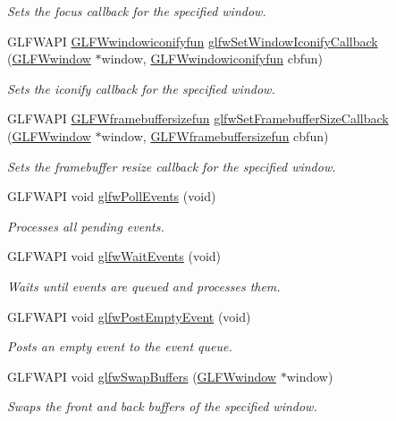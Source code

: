 \begin{DoxyCompactItemize}
\begin{DoxyCompactList}\small\item\em Sets the focus callback for the specified window. \end{DoxyCompactList}\item 
G\+L\+F\+W\+A\+P\+I \hyperlink{group__window_gad2d4e4c3d28b1242e742e8268b9528af}{G\+L\+F\+Wwindowiconifyfun} \hyperlink{group__window_ga17cd86946117b56c76397530900519db}{glfw\+Set\+Window\+Iconify\+Callback} (\hyperlink{group__window_ga3c96d80d363e67d13a41b5d1821f3242}{G\+L\+F\+Wwindow} $\ast$window, \hyperlink{group__window_gad2d4e4c3d28b1242e742e8268b9528af}{G\+L\+F\+Wwindowiconifyfun} cbfun)
\begin{DoxyCompactList}\small\item\em Sets the iconify callback for the specified window. \end{DoxyCompactList}\item 
G\+L\+F\+W\+A\+P\+I \hyperlink{group__window_ga3e218ef9ff826129c55a7d5f6971a285}{G\+L\+F\+Wframebuffersizefun} \hyperlink{group__window_gad766bcdb4465f9c6c62e5d8ca7cfba56}{glfw\+Set\+Framebuffer\+Size\+Callback} (\hyperlink{group__window_ga3c96d80d363e67d13a41b5d1821f3242}{G\+L\+F\+Wwindow} $\ast$window, \hyperlink{group__window_ga3e218ef9ff826129c55a7d5f6971a285}{G\+L\+F\+Wframebuffersizefun} cbfun)
\begin{DoxyCompactList}\small\item\em Sets the framebuffer resize callback for the specified window. \end{DoxyCompactList}\item 
G\+L\+F\+W\+A\+P\+I void \hyperlink{group__window_ga872d16e4c77f58c0436f356255920cfc}{glfw\+Poll\+Events} (void)
\begin{DoxyCompactList}\small\item\em Processes all pending events. \end{DoxyCompactList}\item 
G\+L\+F\+W\+A\+P\+I void \hyperlink{group__window_ga6e042d05823c11e11c7339b81a237738}{glfw\+Wait\+Events} (void)
\begin{DoxyCompactList}\small\item\em Waits until events are queued and processes them. \end{DoxyCompactList}\item 
G\+L\+F\+W\+A\+P\+I void \hyperlink{group__window_gad6f6b997278c91c43b35970eb9713d7e}{glfw\+Post\+Empty\+Event} (void)
\begin{DoxyCompactList}\small\item\em Posts an empty event to the event queue. \end{DoxyCompactList}\item 
G\+L\+F\+W\+A\+P\+I void \hyperlink{group__window_gafb827800eedbfcbc97b1e5408df668d7}{glfw\+Swap\+Buffers} (\hyperlink{group__window_ga3c96d80d363e67d13a41b5d1821f3242}{G\+L\+F\+Wwindow} $\ast$window)
\begin{DoxyCompactList}\small\item\em Swaps the front and back buffers of the specified window. \end{DoxyCompactList}\end{DoxyCompactItemize}


